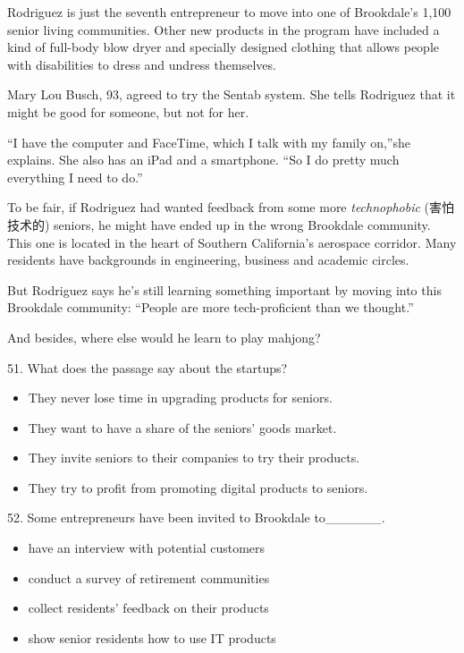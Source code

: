 \documentclass[UTF8,11pt]{ctexart}
\begin{document}
Rodriguez is just the seventh entrepreneur to move into one of Brookdale’s 1,100 senior living communities. Other new products in the program have included a kind of full-body blow dryer and specially designed clothing that allows people with disabilities to dress and undress themselves.


Mary Lou Busch, 93, agreed to try the Sentab system. She tells Rodriguez that it might be good for someone, but not for her.


“I have the computer and FaceTime, which I talk with my family on,”she explains. She also has an iPad and a smartphone. “So I do pretty much everything I need to do.”


To be fair, if Rodriguez had wanted feedback from some more\textit{ technophobic} (害怕技术的) seniors, he might have ended up in the wrong Brookdale community. This one is located in the heart of Southern California’s aerospace corridor. Many residents have backgrounds in engineering, business and academic circles.


But Rodriguez says he's still learning something important by moving into this Brookdale community: “People are more tech-proficient than we thought.”


And besides, where else would he learn to play mahjong?


51. What does the passage say about the startups?


\begin{itemize}[leftmargin=2em,itemsep=.2em,topsep=.4em]\item[A.] They never lose time in upgrading products for seniors.
\item[B.] They want to have a share of the seniors’ goods market.
\item[C.] They invite seniors to their companies to try their products.
\item[D.] They try to profit from promoting digital products to seniors.
\end{itemize}

52. Some entrepreneurs have been invited to Brookdale to\_\_\_\_\_\_.


\begin{itemize}[leftmargin=2em,itemsep=.2em,topsep=.4em]\item[A.] have an interview with potential customers
\item[B.] conduct a survey of retirement communities
\end{itemize}

\begin{itemize}[leftmargin=2em,itemsep=.2em,topsep=.4em]\item[C.] collect residents’ feedback on their products
\item[D.] show senior residents how to use IT products
\end{itemize}
\end{document}

